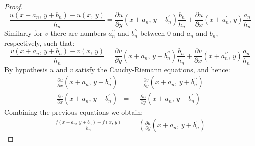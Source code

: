 \documentclass{article}
\theoremstyle{definition}
\begin{document}
\begin{proof}
\begin{equation}
                \frac{u(x+a_{n},\,y+b_{n})-u(x,\,y)}{h_{n}}
                =\frac{\partial{u}}{\partial{y}}
                \left(x+a_{n},\,y+b_{n}^{\prime}\right)\frac{b_{n}}{h_{n}}
                +\frac{\partial{u}}{\partial{x}}
                \left(x+a_{n}^{\prime},\,y\right)\frac{a_{n}}{h_{n}}
            \end{equation}
            Similarly for $v$ there are numbers $a_{n}^{\prime\prime}$ and
            $b_{n}^{\prime\prime}$ between $0$ and $a_{n}$ and $b_{n}$,
            respectively, such that:
            \begin{equation}
                \frac{v(x+a_{n},\,y+b_{n})-v(x,\,y)}{h_{n}}
                =\frac{\partial{v}}{\partial{y}}
                \left(x+a_{n},\,y+b_{n}^{\prime\prime}\right)
                \frac{b_{n}}{h_{n}}
                +\frac{\partial{v}}{\partial{x}}
                \left(x+a_{n}^{\prime\prime},\,y\right)
                \frac{a_{n}}{h_{n}}
            \end{equation}
            By hypothesis $u$ and $v$ satisfy the Cauchy-Riemann equations,
            and hence:
            \begin{equation}
                \begin{array}{rcl}
                    \displaystyle
                    \frac{\partial{u}}{\partial{x}}
                    \left(x+a_{n},\,y+b_{n}^{\prime\prime}\right)
                    &=&
                    \displaystyle
                    \phantom{+}
                    \frac{\partial{v}}{\partial{y}}
                    \left(x+a_{n},\,y+b_{n}^{\prime\prime}\right)\\[1.5em]
                    \displaystyle
                    \frac{\partial{v}}{\partial{x}}
                    \left(x+a_{n},\,y+b_{n}^{\prime}\right)
                    &=&
                    \displaystyle
                    -\frac{\partial{u}}{\partial{y}}
                    \left(x+a_{n},\,y+b_{n}^{\prime}\right)
                \end{array}
            \end{equation}
            Combining the previous equations we obtain:
            \begin{equation}
                \begin{array}{rcl}
                    \displaystyle
                    \frac{f(x+a_{n},\,y+b_{n})-f(x,\,y)}{h_{n}}
                    &=&
                    \displaystyle
                    \left(
                        \frac{\partial{u}}{\partial{y}}
                        \left(x+a_{n},\,y+b_{n}^{\prime}\right)

\end{array}
\end{equation}
\end{proof}
\end{document}

